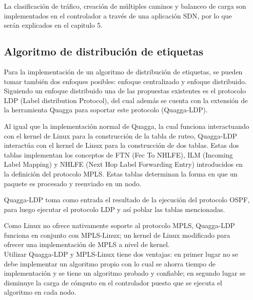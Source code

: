 La clasificaci\'on de tr\'afico, creación de m\'ultiples caminos y balanceo de carga son implementados en el controlador a través de una aplicaci\'on SDN, por lo que ser\'an explicados en el capitulo 5.

\subsection{Algoritmo de distribución de etiquetas}

Para la implementaci\'on de un algoritmo de distribución de etiquetas, se pueden tomar también dos enfoques posibles: enfoque centralizado y enfoque distribuido.\\

Siguiendo un enfoque distribuido una de las propuestas existentes es el protocolo LDP (Label distribution Protocol), del cual adem\'as se cuenta con la extensi\'on de la herramienta Quagga para soportar este protocolo (Quagga-LDP).

Al igual que la implementaci\'on normal de Quagga, la cual funciona interactuando con el kernel de Linux para la construcci\'on de la tabla de ruteo, Quagga-LDP interact\'ua con el kernel de Linux para la construcci\'on de dos tablas. Estas dos tablas implementan los conceptos de FTN (Fec To NHLFE), ILM (Incoming Label Mapping) y NHLFE (Next Hop Label Forwarding Entry) introducidos en la definición del protocolo MPLS.  Estas tablas determinan la forma en que un paquete es procesado y reenviado en un nodo.

Quagga-LDP toma como entrada el resultado de la ejecuci\'on del protocolo OSPF, para luego ejecutar el protocolo LDP y así poblar las tablas mencionadas.

Como Linux no ofrece nativamente soporte al protocolo MPLS, Quagga-LDP funciona en conjunto con MPLS-Linux; un kernel de Linux modificado para ofrecer una implementaci\'on de MPLS a nivel de kernel.\\

Utilizar Quagga-LDP y MPLS-Linux tiene dos ventajas: en primer lugar no se debe implementar un algoritmo propio con lo cual se ahorra tiempo de implementaci\'on y se tiene un algoritmo probado y confiable; en segundo lugar se disminuye la carga de c\'omputo en el controlador puesto que se ejecuta el algoritmo en cada nodo.


